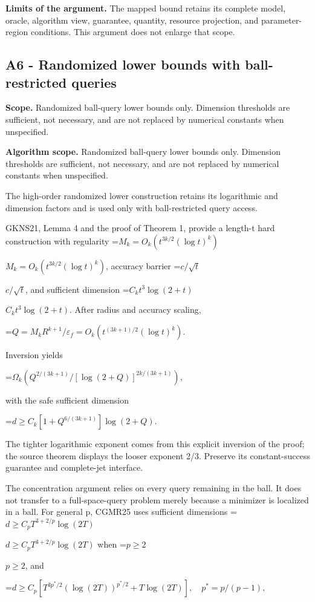 \documentclass[10pt,a4paper]{article}
\newcommand{\AtlasMath}[1]{\par\begingroup\centering\setbox0=\hbox{$\displaystyle #1$}\ifdim\wd0>1.4\linewidth\typeout{ATLAS WIDE FORMULA: \the\wd0}\fi\ifdim\wd0>\linewidth\resizebox{\linewidth}{!}{\box0}\else\box0\fi\par\endgroup}
\newcommand{\AtlasInlineMath}[1]{\begingroup\setbox0=\hbox{$#1$}\ifdim\wd0>.4\linewidth\endgroup\AtlasMath{#1}\else\endgroup$#1$\fi}
\begin{document}
\textbf{Limits of the argument.} The mapped bound retains its complete model, oracle, algorithm view, guarantee, quantity, resource projection, and parameter-region conditions. This argument does not enlarge that scope.

\subsection{A6 - Randomized lower bounds with ball-restricted queries}
\textbf{Scope.} Randomized ball-query lower bounds only. Dimension thresholds are sufficient, not necessary, and are not replaced by numerical constants when unspecified.

\textbf{Algorithm scope.} Randomized ball-query lower bounds only. Dimension thresholds are sufficient, not necessary, and are not replaced by numerical constants when unspecified.

The high-order randomized lower construction retains its logarithmic and dimension factors and is used only with ball-restricted query access.

GKNS21, Lemma 4 and the proof of Theorem 1, provide a length-t hard construction with regularity \AtlasInlineMath{M_k=O_k(t^{3k/2}(\log t)^k)}, accuracy barrier \AtlasInlineMath{c/\sqrt t}, and sufficient dimension \AtlasInlineMath{C_kt^3\log(2+t)}. After radius and accuracy scaling,

\AtlasMath{Q=M_kR^{k+1}/\varepsilon_f=O_k(t^{(3k+1)/2}(\log t)^k).}

Inversion yields

\AtlasMath{\Omega_k\left(Q^{2/(3k+1)}/[\log(2+Q)]^{2k/(3k+1)}\right),}

with the safe sufficient dimension

\AtlasMath{d\ge C_k[1+Q^{6/(3k+1)}]\log(2+Q).}

The tighter logarithmic exponent comes from this explicit inversion of the proof; the source theorem displays the looser exponent 2/3. Preserve its constant-success guarantee and complete-jet interface.

The concentration argument relies on every query remaining in the ball. It does not transfer to a full-space-query problem merely because a minimizer is localized in a ball. For general p, CGMR25 uses sufficient dimensions \AtlasInlineMath{d\ge C_pT^{3+2/p}\log(2T)} when \AtlasInlineMath{p\ge2}, and

\AtlasMath{d\ge C_p[T^{3p^*/2}(\log(2T))^{p^*/2}+T\log(2T)],\quad p^*=p/(p-1),}
\end{document}
